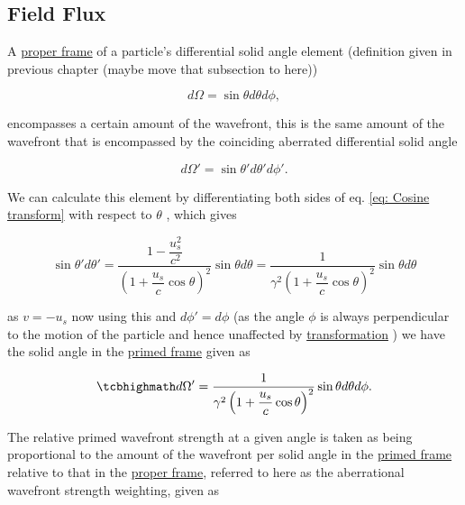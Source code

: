 \subsection{Field Flux}

A \hyperlink{def-proper-frame}{proper frame} of a particle's differential solid angle element (definition given in previous chapter (maybe move that subsection to here))

\begin{equation}
	d\Omega = \sin{\theta} d\theta d\phi,
\end{equation}

encompasses a certain amount of the wavefront, this is the same amount of the wavefront that is encompassed by the coinciding aberrated differential solid angle

\begin{equation}
	d\Omega{'} = \sin{\theta'} d\theta{'} d\phi{'}.
\end{equation}

We can calculate this element by differentiating both sides of eq. \eqref{eq: Cosine transform} with respect to $\theta$ \cite{hogg1997special}, which gives

\begin{equation}
	\sin{\theta'} d\theta{'} = \dfrac{1-\dfrac{u_s^2}{c^2}}{\left(1+\dfrac{u_s}{c}\cos{\theta}\right)^2} \sin{\theta} d\theta = \dfrac{1}{{\gamma}^2\left(1+\dfrac{u_s}{c}\cos{\theta}\right)^2} \sin{\theta} d\theta
\end{equation}

as $v=-u_s$ now using this and $d\phi{'}=d\phi$ (as the angle $\phi$ is always perpendicular to the motion of the particle and hence unaffected by \hyperlink{def-transform}{transformation} ) we have the solid angle in the \hyperlink{def-Primed-Frame}{primed frame} given as

\begin{equation}
	\mhl{
		d\Omega{'} = \dfrac{1}{{\gamma}^2\left(1+\dfrac{u_s}{c}\cos{\theta}\right)^2} \sin{\theta} d\theta d\phi.
	}
\end{equation}

The relative primed wavefront strength at a given angle is taken as being proportional to the amount of the wavefront per solid angle in the \hyperlink{def-Primed-Frame}{primed frame} relative to that in the \hyperlink{def-proper-frame}{proper frame}, referred to here as the aberrational wavefront strength weighting, given as

